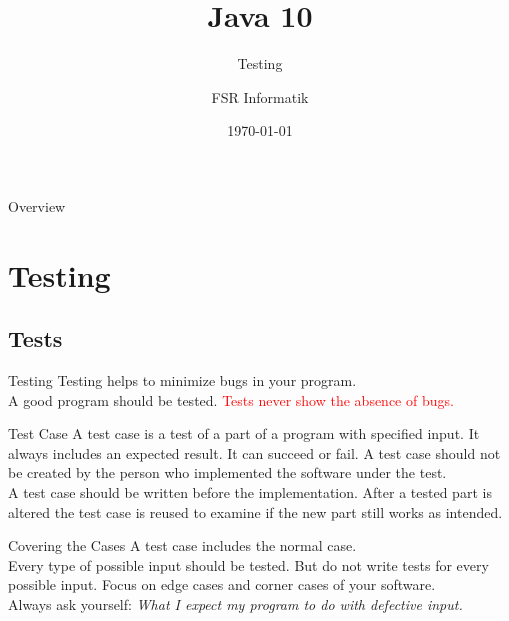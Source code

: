 

\title{Java 10}
\subtitle{Testing}
\author{FSR Informatik}
\date{\today}



\begin{frame}
\titlepage
\end{frame}

\begin{frame}{Overview}
\tableofcontents
\end{frame}

\section{Testing}
\subsection{Tests}
\begin{frame}{Testing}
	Testing helps to minimize bugs in your program. \\
	A good program should be tested.
	\vfill
	\textcolor{red}{Tests never show the absence of bugs.}
\end{frame}
\begin{frame}{Test Case}
	A test case is a test of a part of a program with specified input. 
	It always includes an expected result.
	It can succeed or fail.
	\vfill
	A test case should not be created by the person who implemented the software under the test. \\
	A test case should be written before the implementation.
	\vfill
	After a tested part is altered the test case is reused to examine if the new part still works as intended.
\end{frame}
\begin{frame}{Covering the Cases}
	A test case includes the normal case. \\
	Every type of possible input should be tested. But do not write tests for every possible input.
	\vfill
	Focus on edge cases and corner cases of your software. \\
	Always ask yourself: \emph{What I expect my program to do with defective input.}
\end{frame}


